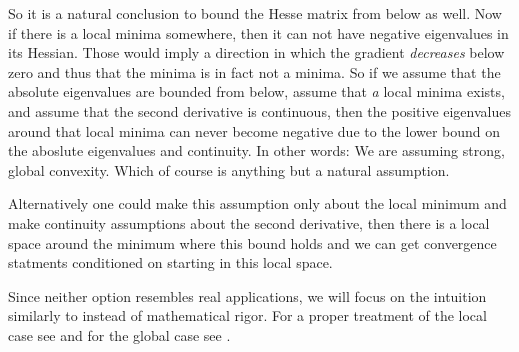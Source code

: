 So it is a natural conclusion to bound the Hesse matrix from below as well.
Now if there is a local minima somewhere, then it can not have negative
eigenvalues in its Hessian. Those would imply a direction in which the gradient
\emph{decreases} below zero and thus that the minima is in fact not a minima.
So if we assume that the absolute eigenvalues are bounded from below, assume
that \emph{a} local minima exists, and assume that the second derivative is
continuous, then the positive eigenvalues around that local minima can
never become negative due to the lower bound on the aboslute eigenvalues and
continuity. In other words: We are assuming strong, global convexity. Which of
course is anything but a natural assumption.

Alternatively one could make this assumption only about the local minimum and
make continuity assumptions about the second derivative, then there is a local
space around the minimum where this bound holds and we can get convergence
statments conditioned on starting in this local space.

Since neither option resembles real applications, we will focus on the intuition
similarly to \textcite{gohWhyMomentumReally2017} instead of mathematical rigor.
For a proper treatment of the local case see \textcite[Theorem
1.2.4]{nesterovLecturesConvexOptimization2018} and for the global case see
\textcite[Theorem 2.1.15]{nesterovLecturesConvexOptimization2018}.


